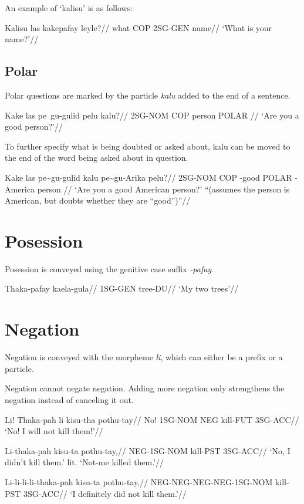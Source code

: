 An example of `kalisu' is as follows:

\ex
\begingl
    \gla  Kalisu las kakepafay leyle?//
    \glb  what COP 2SG-GEN name//
    \glft`What is your name?'//
\endgl
\xe


\subsection{Polar}
Polar questions are marked by the particle \emph{kalu} added to the end of a sentence.

\ex
\begingl
    \gla  Kake las pe~gu-gulid pelu kalu?//
    \glb  2SG-NOM COP \agradj{} person POLAR //
    \glft`Are you a good person?'//
\endgl
\xe


To further specify what is being doubted or asked about, kalu can be moved to the end of the word being asked about in question.

\ex
\begingl
\gla  Kake las pe\~{}gu-gulid kalu pe\~{}gu-Arika pelu?//
\glb  2SG-NOM COP \agradj{}-good POLAR \agradj{}-America person //
\glft `Are you a good American person?' ``(assumes the person is American, but doubts whether they are ``good'')''//
\endgl
\xe


\section{Posession}
Posession is conveyed using the genitive case suffix \emph{-pafay}.

\ex
\begingl
    \gla  Thaka-pafay kaela-gula//
    \glb  1SG-GEN tree-DU//
    \glft `My two trees'//
\endgl
\xe


\section{Negation}
Negation is conveyed with the morpheme \emph{li}, which can either be a prefix or a particle.

Negation cannot negate negation.
Adding more negation only strengthens the negation instead of canceling it out.

\ex
\begingl
    \gla  Li! Thaka-pah li kisu-tha pothu-tay//
    \glb  No! 1SG-NOM NEG kill-FUT 3SG-ACC//
    \glft `No! I will not kill them!'//
\endgl
\xe


\ex
\begingl
    \gla  Li-thaka-pah kisu-ta pothu-tay,//
    \glb  NEG-1SG-NOM kill-PST 3SG-ACC//
    \glft `No, I didn't kill them.' lit. `Not-me killed them.'//
\endgl
\xe

\ex
\begingl
    \gla  Li-li-li-li-thaka-pah kisu-ta pothu-tay,//
    \glb  NEG-NEG-NEG-NEG-1SG-NOM kill-PST 3SG-ACC//
    \glft `I definitely did not kill them.'//
\endgl
\xe


